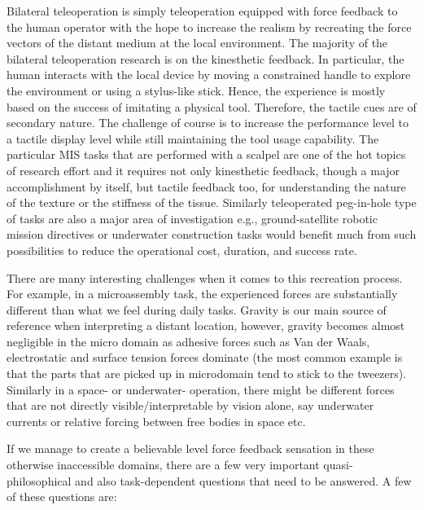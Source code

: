 Bilateral teleoperation is simply teleoperation equipped with force feedback to the human operator with the hope to increase the realism 
by recreating the force vectors of the distant medium at the local environment. The majority of the bilateral teleoperation research is 
on the kinesthetic feedback. In particular, the human interacts with the local device by moving a constrained handle to explore the 
environment or using a stylus-like stick. Hence, the experience is mostly based on the success of imitating a physical tool. Therefore, 
the tactile cues are of secondary nature. The challenge of course is to increase the performance level to a tactile display level while 
still maintaining the tool usage capability. The particular MIS tasks that are performed with a scalpel are one of the hot topics of 
research effort and it requires not only kinesthetic feedback, though a major accomplishment by itself, but tactile feedback too, for 
understanding the nature of the texture or the stiffness of the tissue. Similarly teleoperated peg-in-hole type of tasks are also a major 
area of investigation e.g., ground-satellite robotic mission directives or underwater construction tasks would benefit much from such 
possibilities to reduce the operational cost, duration, and success rate. 



There are many interesting challenges when it comes to this recreation process. For example, in a microassembly task, the experienced 
forces are substantially different than what we feel during daily tasks. Gravity is our main source of reference when interpreting a 
distant location, however, gravity becomes almost negligible in the micro domain as adhesive forces such as Van der Waals, electrostatic 
and surface tension forces dominate (the most common example is that the parts that are picked up in microdomain tend to stick to the 
tweezers). Similarly in a space- or underwater- operation, there might be different forces that are not directly visible/interpretable by 
vision alone, say underwater currents or relative forcing between free bodies in space etc.

If we manage to create a believable level force feedback sensation in these otherwise inaccessible domains, there are a few very 
important quasi-philosophical and also task-dependent questions that need to be answered. A few of these questions are:

